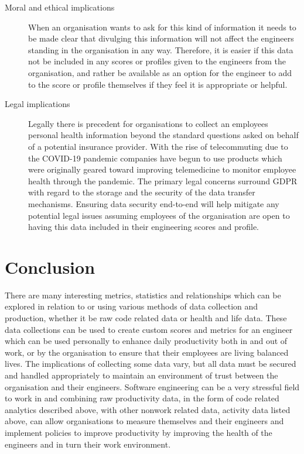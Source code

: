 \documentclass[11pt, a4paper]{article}
\begin{document}
\begin{description}
        \begin{description}
            \item[Moral and ethical implications] When an organisation wants to ask for this kind of information it needs to be made clear that divulging this information will not affect the engineers standing in the organisation in any way. Therefore, it is easier if this data not be included in any scores or profiles given to the engineers from the organisation, and rather be available as an option for the engineer to add to the score or profile themselves if they feel it is appropriate or helpful.
            \item[Legal implications] Legally there is precedent for organisations to collect an employees personal health information beyond the standard questions asked on behalf of a potential insurance provider. With the rise of telecommuting due to the COVID-19 pandemic companies have begun to use products which were originally geared toward improving telemedicine to monitor employee health through the pandemic. The primary legal concerns surround GDPR with regard to the storage and the security of the data transfer mechanisms. Ensuring data security end-to-end will help mitigate any potential legal issues assuming employees of the organisation are open to having this data included in their engineering scores and profile.
        \end{description} 
    \end{description}
    
    \section*{Conclusion}
    There are many interesting metrics, statistics and relationships which can be explored in relation to or using various methods of data collection and production, whether it be raw code related data or health and life data. These data collections can be used to create custom scores and metrics for an engineer which can be used personally to enhance daily productivity both in and out of work, or by the organisation to ensure that their employees are living balanced lives. The implications of collecting some data vary, but all data must be secured and handled appropriately to maintain an environment of trust between the organisation and their engineers. Software engineering can be a very stressful field to work in and combining raw productivity data, in the form of code related analytics described above, with other nonwork related data, activity data listed above, can allow organisations to measure themselves and their engineers and implement policies to improve productivity by improving the health of the engineers and in turn their work environment.
    
\end{document}
